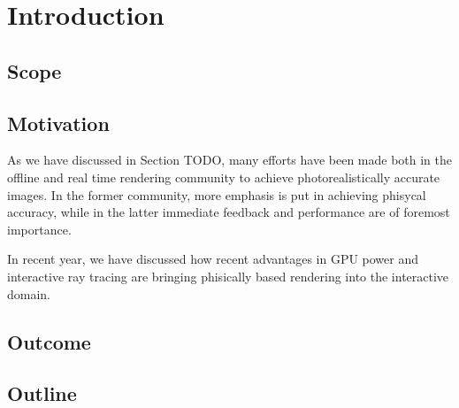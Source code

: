 \chapter{Introduction}
\label{sec:intro}
\section{Scope}

\section{Motivation}

As we have discussed in Section TODO, many efforts have been made both in the offline and real time rendering community to achieve photorealistically accurate images. In the former community, more emphasis is put in achieving phisycal accuracy, while in the latter immediate feedback and performance are of foremost importance.

In recent year, we have discussed how recent advantages in GPU power and interactive ray tracing are bringing phisically based rendering into the interactive domain. 
\section{Outcome}

\section{Outline}